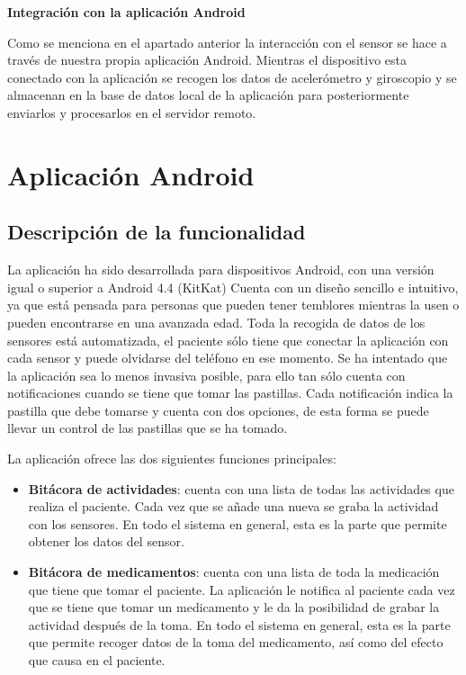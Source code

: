 \documentclass[11pt,spanish]{article}
\begin{document}
{\bf Integración con la aplicación Android}
\newline

Como se menciona en el apartado anterior la interacción con el sensor se hace a través de nuestra propia aplicación Android. Mientras el dispositivo esta conectado con la aplicación se recogen los datos de acelerómetro y giroscopio y se almacenan en la base de datos local de la aplicación para posteriormente enviarlos y procesarlos en el servidor remoto.
\newpage

\section{Aplicación Android}
\subsection{Descripción de la funcionalidad}
La aplicación ha sido desarrollada para dispositivos Android, con una versión igual o superior a Android 4.4 (KitKat) Cuenta con un diseño sencillo e intuitivo, ya que está pensada para personas que pueden tener temblores mientras la usen o pueden encontrarse en una avanzada edad. Toda la recogida de datos de los sensores está automatizada, el paciente sólo tiene que conectar la aplicación con cada sensor y puede olvidarse del teléfono en ese momento. Se ha intentado que la aplicación sea lo menos invasiva posible, para ello tan sólo cuenta con notificaciones cuando se tiene que tomar las pastillas. Cada notificación indica la pastilla que debe tomarse y cuenta con dos opciones, de esta forma se puede llevar un control de las pastillas que se ha tomado.
\newline

La aplicación ofrece las dos siguientes funciones principales:

\begin{itemize}
	\item {\bf Bitácora de actividades}: cuenta con una lista de todas las actividades que realiza el paciente. Cada vez que se añade una nueva se graba la actividad con los sensores. En todo el sistema en general, esta es la parte que permite obtener los datos del sensor.
    \item {\bf Bitácora de medicamentos}: cuenta con una lista de toda la medicación que tiene que tomar el paciente. La aplicación le notifica al paciente cada vez que se tiene que tomar un medicamento y le da la posibilidad de grabar la actividad después de la toma. En todo el sistema en general, esta es la parte que permite recoger datos de la toma del medicamento, así como del efecto que causa en el paciente.
\end{itemize}
\end{document}
